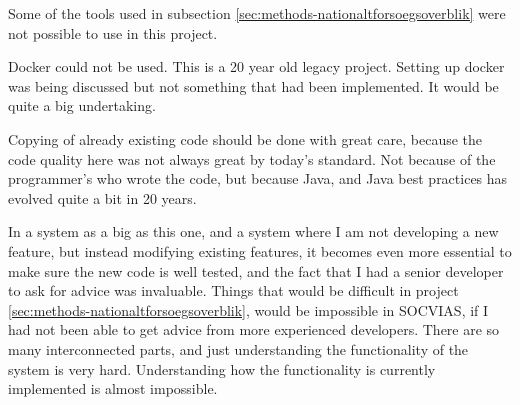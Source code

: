 \documentclass[../main.tex]{subfiles}
\begin{document}
Some of the tools used in subsection \ref{sec:methods-nationaltforsoegsoverblik} were not possible to use in this project. 

Docker could not be used. This is a 20 year old legacy project. Setting up docker was being discussed but not something that had been implemented. It would be quite a big undertaking.

Copying of already existing code should be done with great care, because the code quality here was not always great by today's standard. Not because of the programmer's who wrote the code, but because Java, and Java best practices has evolved quite a bit in 20 years.

In a system as a big as this one, and a system where I am not developing a new feature, but instead modifying existing features, it becomes even more essential to make sure the new code is well tested, and the fact that I had a senior developer to ask for advice was invaluable. Things that would be difficult in project \ref{sec:methods-nationaltforsoegsoverblik}, would be impossible in SOCVIAS, if I had not been able to get advice from more experienced developers. There are so many interconnected parts, and just understanding the functionality of the system is very hard. Understanding how the functionality is currently implemented is almost impossible. 





\end{document}
